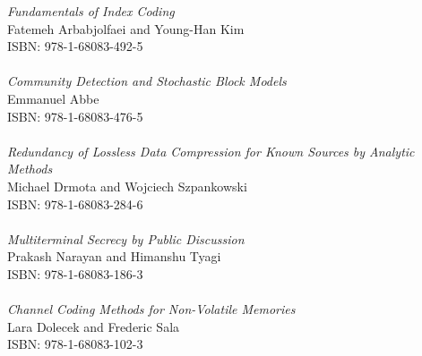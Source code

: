 \vspace{12pt}
\noindent \textit{Fundamentals of Index Coding}\\
Fatemeh Arbabjolfaei and Young-Han Kim\\
ISBN: 978-1-68083-492-5\\
\\
\noindent \textit{Community Detection and Stochastic Block Models}\\
Emmanuel Abbe\\
ISBN: 978-1-68083-476-5\\
\\
\noindent \textit{Redundancy of Lossless Data Compression for Known Sources by Analytic Methods}\\
Michael Drmota and Wojciech Szpankowski\\
ISBN: 978-1-68083-284-6\\
\\
\noindent \textit{Multiterminal Secrecy by Public Discussion}\\
Prakash Narayan and Himanshu Tyagi\\
ISBN: 978-1-68083-186-3\\
\\
\noindent \textit{Channel Coding Methods for Non-Volatile Memories}\\
Lara Dolecek and Frederic Sala \\
ISBN: 978-1-68083-102-3